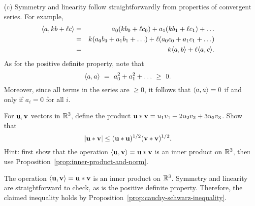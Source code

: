 \begin{ex}
\begin{sol}
    (c) Symmetry and linearity follow straightforwardly from
    properties of convergent series. For example,
    \begin{eqnarray*}
      \langle a,kb+\ell c\rangle
      &=& a_0(kb_0+\ell c_0) + a_1(kb_1+\ell c_1) + \ldots \\
      &=& k(a_0b_0 + a_1b_1 + \ldots) + \ell(a_0c_0 + a_1c_1 + \ldots) \\
      &=& k\langle a,b\rangle + \ell\langle a,c\rangle.
    \end{eqnarray*}
    As for the positive definite property, note that
    \begin{equation*}
      \langle a,a\rangle
      ~=~ a_0^2 + a_1^2 + \ldots
      ~\geq~ 0.      
    \end{equation*}
    Moreover, since all terms in the series are $\geq 0$, it follows
    that $\langle a,a\rangle=0$ if and only if $a_i=0$ for all $i$.
  \end{sol}
\end{ex}

\begin{ex}
  For $\vect{u},\vect{v}$ vectors in $\mathbb{R}^3$, define the product
  $\vect{u}\ast \vect{v} = u_{1}v_{1}+2u_{2}v_{2}+3u_{3}v_{3}$. Show
  that 
  \begin{equation*}
    \abs{\vect{u}\ast \vect{v}} \leq (\vect{u}\ast \vect{u})^{1/2}
    (\vect{v}\ast \vect{v})^{1/2}.
  \end{equation*}
  Hint: first show that the operation
  $\iprod{\vect{u},\vect{v}}=\vect{u}\ast\vect{v}$ is an inner product
  on $\mathbb{R}^3$, then use Proposition~\ref{prop:inner-product-and-norm}.
  \begin{sol}
    The operation $\iprod{\vect{u},\vect{v}}=\vect{u}\ast\vect{v}$ is
    an inner product on $\mathbb{R}^3$. Symmetry and linearity are
    straightforward to check, as is the positive definite
    property. Therefore, the claimed inequality holds by
    Proposition~\ref{prop:cauchy-schwarz-inequality}.
  \end{sol}
\end{ex}

